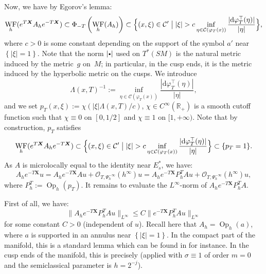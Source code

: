 \documentclass[JEP,XML,SOM,Unicode,NoFloatCountersInSection]{cedram}
\newcommand{\sbullet}{{\scriptscriptstyle\bullet}}
\newcommand{\csbullet}{{\raisebox{1pt}{$\sbullet$}}}
\newcommand{\R}{\mathbb{R}}
\newcommand{\mc}{\mathcal}
\newcommand{\dd}{\mathrm{d}}
\newcommand{\X}{\boldsymbol{X}}
\DeclareMathOperator{\Op}{Op}
\DeclareMathOperator{\WF}{WF}
\theoremstyle{plain}
\theoremstyle{definition}
\begin{document}
Now, we have by Egorov's lemma:
\[
\WF_h(e^{T \X} A_h e^{-T\X}) \subset \Phi_{-T}\left(\WF_h(A_h)\right) \subset \Bigl\{ (x,\xi) \in \mc{C}' \bigm| |\xi| > c \inf_{\eta \in \mc{C}(\varphi_T(x))} \dfrac{|\dd \varphi_T^{\top}(\eta)|}{|\eta|} \Bigr\},
\]
where $c>0$ is some constant depending on the support of the symbol $a'$ near $\left\{|\xi|=1\right\}$. Note that the norm $|\csbullet|$ used on $T^*(SM)$ is the natural metric induced by the metric~$g$ on~$M$; in particular, in the cusp ends, it is the metric induced by the hyperbolic metric on the cusps. We introduce
\[
\Lambda(x,T)^{-1} := \inf_{\eta \in \mc{C}(\varphi_T(x))} \dfrac{|\dd \varphi_T^{\top}(\eta)|}{|\eta|},
\]
and we set $p_T(x,\xi) := \chi(|\xi| \Lambda(x,T)/c)$,
$\chi \in C^\infty(\R_+)$ is a smooth cutoff function such that $\chi \equiv 0$ on $[0,1/2]$ and $\chi \equiv 1$ on $[1,+\infty)$. Note that by construction, $p_T$ satisfies
\[
\WF_h(e^{T \X} A_h e^{-T\X}) \subset \Bigl\{ (x,\xi) \in \mc{C}' \bigm| |\xi| > c \inf_{\eta \in \mc{C}(\varphi_T(x))} \dfrac{|\dd \varphi_T^{\top}(\eta)|}{|\eta|} \Bigr\} \subset\{p_T =1\}.
\]
As $A$ is microlocally equal to the identity near $E_s^*$, we have:
\[
A_h e^{-T\X}u = A_h e^{-T\X} Au + \mc{O}_{T, \Psi_h^{-\infty}}(h^\infty)u= A_h e^{-T\X} P_h^T Au + \mc{O}_{T, \Psi_h^{-\infty}}(h^\infty)u,
\]
where $P_h^T := \Op_h(p_T)$. It remains to evaluate the $L^\infty$-norm of $A_h e^{-T\X} P_h^T A$.

First of all, we have:
\[
\|A_h e^{-T\X} P_h^T A u\|_{L^\infty} \leq C \|e^{-T \X} P_h^T Au\|_{L^\infty}
\]
for some constant $C > 0$ (independent of $u$). Recall here that $A_h = \Op_h(a)$, where $a$ is supported in an annulus near $\left\{|\xi|=1\right\}$. In the compact part of the manifold, this is a standard lemma which can be found in \cite[Lem.\,2.4]{Bonthonneau-Lefeuvre-21} for instance. In the cusp ends of the manifold, this is precisely \cite[Lem.\,3.2]{Bonthonneau-Lefeuvre-19-1} (applied with $\sigma \equiv 1$ of order $m=0$ and the semiclassical parameter is $h = 2^{-j}$).
\end{document}
